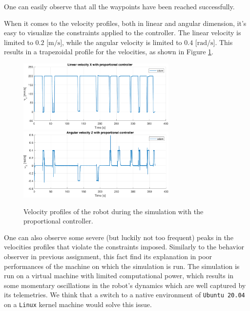 One can easily observe that all the waypoints have been reached successfully.

When it comes to the velocity profiles, both in linear and angular dimension, it's easy to visualize the constraints applied to the controller.
The linear velocity is limited to $0.2 \text{ [m/s]}$, while the angular velocity is limited to $0.4 \text{ [rad/s]}$.
This results in a trapezoidal profile for the velocities, as shown in Figure \ref{fig:proportional_controller_velocity_profiles}.

\begin{figure}[H]
    \centering
    \includegraphics[width=0.7\textwidth]{./img/MATLAB/linear_velocity_proportional.pdf}
    \includegraphics[width=0.7\textwidth]{./img/MATLAB/angular_velocity_proportional.pdf}
    \caption{Velocity profiles of the robot during the simulation with the proportional controller.}
    \label{fig:proportional_controller_velocity_profiles}
\end{figure}

One can also observe some severe (but luckily not too frequent) peaks in the velocities profiles that violate the constraints imposed.
Similarly to the behavior observer in previous assignment, this fact find its explanation in poor performances of the machine on which the simulation is run.
The simulation is run on a virtual machine with limited computational power, which results in some momentary oscillations in the robot's dynamics which are well captured by its telemetries.
We think that a switch to a native environment of \texttt{Ubuntu 20.04} on a \texttt{Linux} kernel machine would solve this issue.

